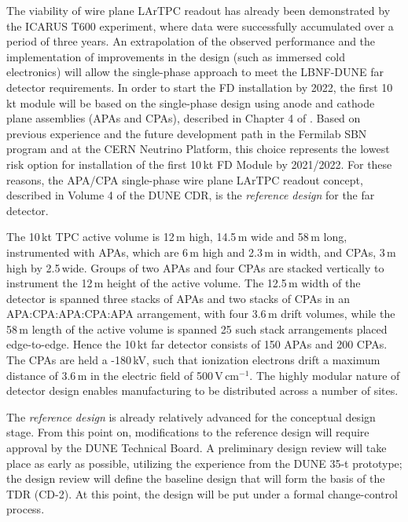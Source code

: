 The viability of wire plane LArTPC readout has already been demonstrated by the ICARUS T600 
experiment, where data were successfully accumulated over a period of three years. 
An extrapolation of the observed performance and the implementation of improvements 
in the design (such as immersed cold electronics) will allow the single-phase 
approach to meet the LBNF-DUNE far detector requirements. In order to start the FD installation
by 2022, the first 10\,kt module will be based on the single-phase design using anode and cathode
plane assemblies (APAs and CPAs), described in Chapter 4 of \voldune. 
Based on previous experience and the 
future development path in the Fermilab SBN program and at the CERN Neutrino Platform, 
this choice represents the lowest risk option for installation of the first 10\,kt FD Module by 
2021/2022. For these reasons, the APA/CPA single-phase wire plane LArTPC readout 
concept, described in Volume 4 of the DUNE CDR, is the \textit{reference design} 
for the far detector. 

The 10\,kt TPC active volume is 12\,m high, 14.5\,m wide and 
58\,m long, instrumented with APAs, 
which are 6\,m high and 2.3\,m in width, and CPAs, 3\,m high by 2.5\,wide. Groups of
two APAs and four CPAs are stacked vertically to instrument 
the 12\,m height of the active volume. The 12.5\,m width of the detector is 
spanned three stacks of APAs and two stacks of CPAs in an APA:CPA:APA:CPA:APA
arrangement, with four 3.6\,m drift volumes, while the 58\,m length of the active volume
is spanned 25 such stack arrangements placed edge-to-edge. Hence the 10\,kt 
far detector consists of 150 APAs and 200 CPAs. The CPAs are held a -180\,kV, such that 
ionization electrons drift a maximum distance of 3.6\,m in the electric field of 500\,V\,cm$^{-1}$.
The highly modular nature of detector design enables manufacturing to be distributed across a number of sites.

The \textit{reference design} is already relatively advanced for the conceptual design 
stage. From this point on, modifications to the reference design will require approval
by the DUNE Technical Board. A preliminary design review will take place as early 
as possible, utilizing the experience from the DUNE 35-t prototype; the design 
review will define the baseline design that will form the basis of the TDR (CD-2). 
At this point, the design will be put under a formal change-control 
process. 

